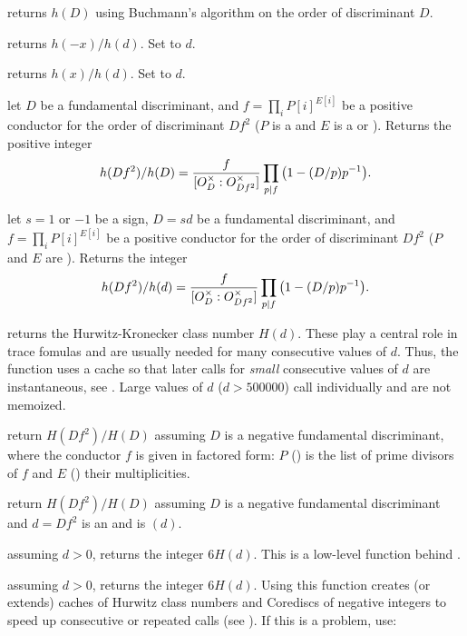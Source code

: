  returns $h(D)$ using Buchmann's algorithm
on the order of discriminant $D$.

 returns $h(-x)/h(d)$.
Set  to $d$.

 returns $h(x)/h(d)$.
Set  to $d$.

let $D$ be a fundamental discriminant, and $f = \prod_i P[i]^{E[i]}$ be a
positive conductor for the order of discriminant $Df^2$ ($P$ is a 
and $E$ is a  or ). Returns the positive integer
$$ h(Df^2) / h(D) = {f \over [O_D^\times : O_{Df^2}^\times]}
   \prod_{p | f} \big(1 - (D/p)p^{-1}\big).$$

let $s = 1$ or $-1$ be a sign, $D = sd$ be a fundamental discriminant,
and $f = \prod_i P[i]^{E[i]}$ be a positive conductor for the order of
discriminant $Df^2$ ($P$ and $E$ are ). Returns the integer
$$ h(Df^2)/h(d) = {f \over [O_D^\times : O_{Df^2}^\times]}
  \prod_{p | f} \big(1 - (D/p)p^{-1}\big).$$

 returns the Hurwitz-Kronecker class number $H(d)$.
These play a central role in trace fomulas and are usually needed for many
consecutive values of $d$. Thus, the function uses a cache so that later
calls for \emph{small} consecutive values of $d$ are instantaneous, see
. Large values of $d$ ($d > 500000$) call 
individually and are not memoized.

 return $H(Df^2)/H(D)$ assuming
$D$ is a negative fundamental discriminant, where the conductor $f$ is given in
factored form: $P$ () is the list of prime divisors of $f$ and $E$
() their multiplicities.

 return $H(Df^2)/H(D)$ assuming
$D$ is a negative fundamental discriminant and $d = Df^2$ is an 
and  is $(d)$.

 assuming $d > 0$, returns the integer $6 H(d)$.
This is a low-level function behind .

 assuming $d > 0$, returns the integer $6
H(d)$. Using this function creates (or extends) caches of Hurwitz class
numbers and Corediscs of negative integers to speed up consecutive or
repeated calls (see ). If this is a problem, use:


